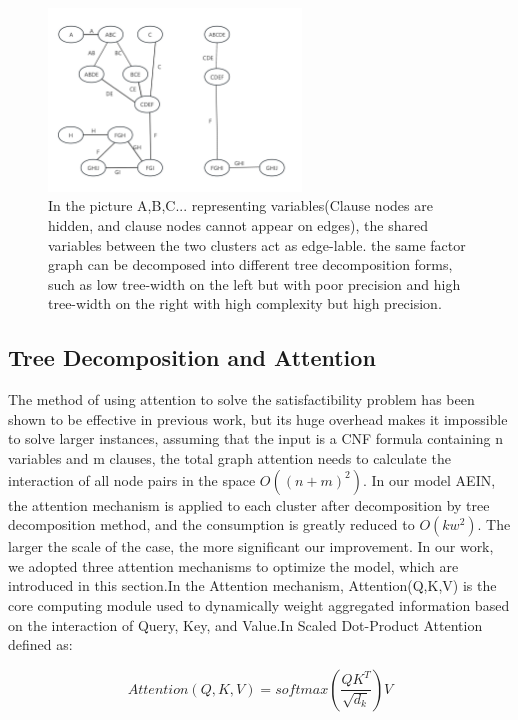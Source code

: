 \begin{figure}[h]
\centering 
\includegraphics[width=0.6\textwidth]{png/JG.png}
\caption{In the picture A,B,C... representing variables(Clause nodes are hidden, and clause nodes cannot appear on edges),
the shared variables between the two clusters act as edge-lable. the same factor graph can be decomposed into different
tree decomposition forms, such as low tree-width on the left but with poor precision and high tree-width on the right with 
high complexity but high precision.} 
\label{fig2}
\end{figure}

\subsection{Tree Decomposition and Attention}
The method of using attention to solve the satisfactibility problem has been shown to be effective in previous work, but 
its huge overhead makes it impossible to solve larger instances, assuming that the input is a CNF formula containing n 
variables and m clauses, the total graph attention needs to calculate the interaction of all node pairs in the space \(O((n+m)^2)\). 
In our model AEIN, the attention mechanism is applied to each cluster after decomposition by tree decomposition method, and 
the consumption is greatly reduced to \(O(kw^2)\). The larger the scale of the case, the more significant our improvement.
In our work, we adopted three attention mechanisms to optimize the model, which are introduced in this section.In the Attention 
mechanism, Attention(Q,K,V) is the core computing module used to dynamically weight aggregated information based on the 
interaction of Query, Key, and Value.In Scaled Dot-Product Attention defined as:

\begin{equation}
Attention(Q,K,V)=softmax(\frac{QK^T}{\sqrt{d_k}})V
\end{equation}

